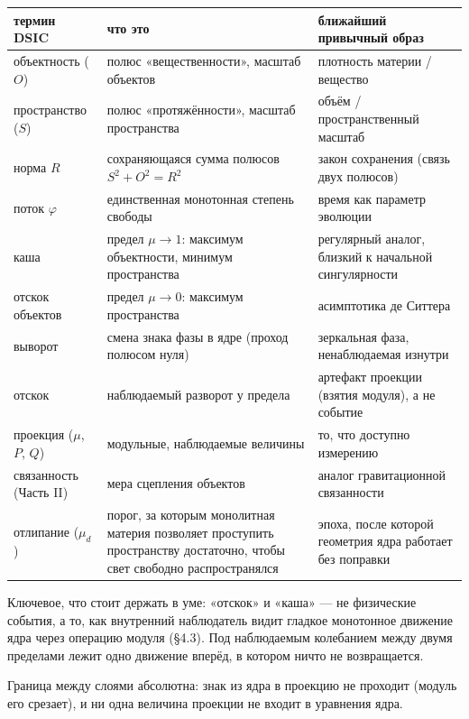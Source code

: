\documentclass{article}
\begin{document}
\begin{table}[H]
\centering
\small
\begin{tabular}{@{}p{2.4cm}p{3.2cm}p{3.2cm}@{}}
\toprule
\textbf{термин DSIC} & \textbf{что это} & \textbf{ближайший привычный образ} \\
\midrule
объектность ($O$) & полюс «вещественности», масштаб объектов & плотность материи / вещество \\
\addlinespace
пространство ($S$) & полюс «протяжённости», масштаб пространства & объём / пространственный масштаб \\
\addlinespace
норма $R$ & сохраняющаяся сумма полюсов $S^2 + O^2 = R^2$ & закон сохранения (связь двух полюсов) \\
\addlinespace
поток $\varphi$ & единственная монотонная степень свободы & время как параметр эволюции \\
\addlinespace
каша & предел $\mu \to 1$: максимум объектности, минимум пространства & регулярный аналог, близкий к начальной сингулярности \\
\addlinespace
отскок объектов & предел $\mu \to 0$: максимум пространства & асимптотика де Ситтера \\
\addlinespace
выворот & смена знака фазы в ядре (проход полюсом нуля) & зеркальная фаза, ненаблюдаемая изнутри \\
\addlinespace
отскок & наблюдаемый разворот у предела & артефакт проекции (взятия модуля), а не событие \\
\addlinespace
проекция ($\mu$, $P$, $Q$) & модульные, наблюдаемые величины & то, что доступно измерению \\
\addlinespace
связанность (Часть II) & мера сцепления объектов & аналог гравитационной связанности \\
\addlinespace
отлипание ($\mu_d$) & порог, за которым монолитная материя позволяет проступить пространству достаточно, чтобы свет свободно распространялся & эпоха, после которой геометрия ядра работает без поправки \\
\bottomrule
\end{tabular}
\end{table}

Ключевое, что стоит держать в уме: «отскок» и «каша» --- не физические события, а то, как внутренний наблюдатель видит гладкое монотонное движение ядра через операцию модуля (\S4.3). Под наблюдаемым колебанием между двумя пределами лежит одно движение вперёд, в котором ничто не возвращается.

Граница между слоями абсолютна: знак из ядра в проекцию не проходит (модуль его срезает), и ни одна величина проекции не входит в уравнения ядра.
\end{document}
